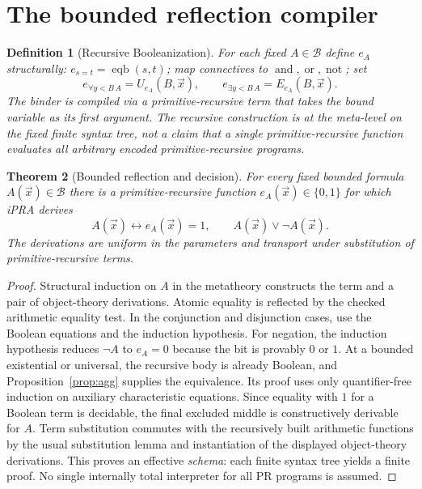 \documentclass[11pt]{article}
\newtheorem{theorem}{Theorem}[section]
\newtheorem{definition}[theorem]{Definition}
\newcommand{\bfam}{\mathcal B}
\begin{document}
\section{The bounded reflection compiler}
\begin{definition}[Recursive Booleanization]
For each fixed $A\in\bfam$ define $e_A$ structurally: $e_{s=t}=\operatorname{eqb}(s,t)$; map connectives to \(\operatorname{and},\operatorname{or},\operatorname{not}\); set
\[e_{\forall y<B\,A}=U_{e_A}(B,\vec x),\qquad e_{\exists y<B\,A}=E_{e_A}(B,\vec x).\]
The binder is compiled via a primitive-recursive term that takes the bound variable as its first argument. The recursive construction is at the meta-level on the \emph{fixed finite syntax tree}, not a claim that a single primitive-recursive function evaluates all arbitrary encoded primitive-recursive programs.
\end{definition}
\begin{theorem}[Bounded reflection and decision]\label{thm:reflection}
For every fixed bounded formula $A(\vec x)\in\bfam$ there is a primitive-recursive function $e_A(\vec x)\in\{0,1\}$ for which iPRA derives
\[A(\vec x)\longleftrightarrow e_A(\vec x)=1,\qquad A(\vec x)\vee\neg A(\vec x).\]
The derivations are uniform in the parameters and transport under substitution of primitive-recursive terms.
\end{theorem}
\begin{proof}
Structural induction on $A$ in the metatheory constructs the term and a pair of object-theory derivations. Atomic equality is reflected by the checked arithmetic equality test. In the conjunction and disjunction cases, use the Boolean equations and the induction hypothesis. For negation, the induction hypothesis reduces $\neg A$ to $e_A=0$ because the bit is provably $0$ or $1$. At a bounded existential or universal, the recursive body is already Boolean, and Proposition~\ref{prop:agg} supplies the equivalence. Its proof uses only quantifier-free induction on auxiliary characteristic equations. Since equality with $1$ for a Boolean term is decidable, the final excluded middle is constructively derivable for $A$. Term substitution commutes with the recursively built arithmetic functions by the usual substitution lemma and instantiation of the displayed object-theory derivations. This proves an effective \emph{schema}: each finite syntax tree yields a finite proof. No single internally total interpreter for all PR programs is assumed.
\end{proof}
\end{document}
